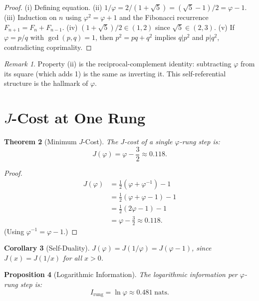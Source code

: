 \documentclass[12pt,a4paper]{article}
\newtheorem{theorem}{Theorem}[section]
\newtheorem{corollary}[theorem]{Corollary}
\newtheorem{proposition}[theorem]{Proposition}
\theoremstyle{definition}
\theoremstyle{remark}
\newtheorem{remark}[theorem]{Remark}
\begin{document}
\begin{proof}
(i) Defining equation.
(ii) $1/\varphi = 2/(1+\sqrt{5}) = (\sqrt{5}-1)/2 = \varphi-1$.
(iii) Induction on $n$ using $\varphi^2 = \varphi + 1$ and the
Fibonacci recurrence $F_{n+1} = F_n + F_{n-1}$.
(iv) $(1+\sqrt{5})/2 \in (1, 2)$ since $\sqrt{5} \in (2, 3)$.
(v) If $\varphi = p/q$ with $\gcd(p,q)=1$, then
$p^2 = pq + q^2$ implies $q | p^2$ and $p | q^2$, contradicting
coprimality.
\end{proof}

\begin{remark}
Property (ii) is the reciprocal-complement identity: subtracting
$\varphi$ from its square (which adds 1) is the same as inverting
it.  This self-referential structure is the hallmark of
$\varphi$.
\end{remark}

\section{$J$-Cost at One Rung}
\label{sec:jcost}

\begin{theorem}[Minimum $J$-Cost]
\label{thm:jcost}
The $J$-cost of a single $\varphi$-rung step is:
\begin{equation}
  \boxed{J(\varphi) = \varphi - \frac{3}{2} \approx 0.118.}
\end{equation}
\end{theorem}

\begin{proof}
\begin{align}
  J(\varphi) &= \frac{1}{2}(\varphi + \varphi^{-1}) - 1 \\
  &= \frac{1}{2}(\varphi + \varphi - 1) - 1 \\
  &= \frac{1}{2}(2\varphi - 1) - 1 \\
  &= \varphi - \frac{3}{2} \approx 0.118.
\end{align}
(Using $\varphi^{-1} = \varphi - 1$.)
\end{proof}

\begin{corollary}[Self-Duality]
$J(\varphi) = J(1/\varphi) = J(\varphi - 1)$, since
$J(x) = J(1/x)$ for all $x > 0$.
\end{corollary}

\begin{proposition}[Logarithmic Information]
\label{prop:loginfo}
The logarithmic information per $\varphi$-rung step is:
\begin{equation}
  I_{\mathrm{rung}} = \ln\varphi \approx 0.481\;\text{nats}.
\end{equation}
\end{proposition}
\end{document}
